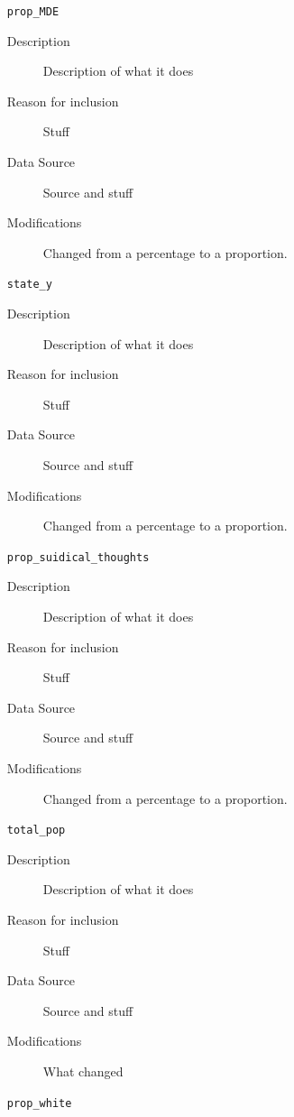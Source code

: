 \documentclass{article}
\begin{document}
\begin{itemize}[label={}, align=left]
\begin{description}
          \end{description}
    \item[\texttt{prop\_MDE}] \
          \begin{description}
              \item[Description] Description of what it does
              \item[Reason for inclusion] Stuff
              \item[Data Source] Source and stuff
              \item[Modifications] Changed from a percentage to a proportion.
          \end{description}
    \item[\texttt{state\_y}] \
          \begin{description}
              \item[Description] Description of what it does
              \item[Reason for inclusion] Stuff
              \item[Data Source] Source and stuff
              \item[Modifications] Changed from a percentage to a proportion.
          \end{description}
    \item[\texttt{prop\_suidical\_thoughts}] \
          \begin{description}
              \item[Description] Description of what it does
              \item[Reason for inclusion] Stuff
              \item[Data Source] Source and stuff
              \item[Modifications] Changed from a percentage to a proportion.
          \end{description}
    \item[\texttt{total\_pop}] \
          \begin{description}
              \item[Description] Description of what it does
              \item[Reason for inclusion] Stuff
              \item[Data Source] Source and stuff
              \item[Modifications] What changed
          \end{description}
    \item[\texttt{prop\_white}] \
          \begin{description}

\end{description}
\end{itemize}
\end{document}

